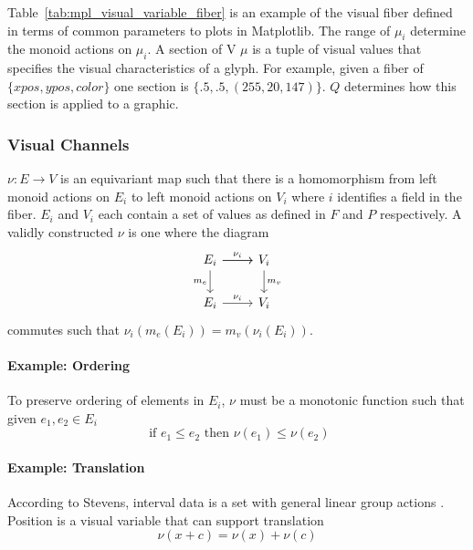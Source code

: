 \documentclass[../main.tex]{subfiles}
\begin{document}
Table~\ref{tab:mpl_visual_variable_fiber} is an example of the visual fiber defined in terms of common parameters to plots in Matplotlib. The range of $\mu_{i}$ determine the monoid actions on $\mu_{i}$. A section of V $\mu$ is a tuple of visual values that specifies the visual characteristics of a glyph. For example, given a fiber of $\{xpos, ypos, color\}$ one section is $\{.5, .5, (255, 20,147)\}$. $Q$ determines how this section is applied to a graphic.  

\subsubsection{Visual Channels}
\label{sec:artist_nu}
$\nu: E \rightarrow V$ is an equivariant map such that there is a homomorphism from left monoid actions on $E_{i}$ to left monoid actions on $V_{i}$ where $i$ identifies a field in the fiber. $E_i$ and $V_{i}$ each contain a set of values as defined in $F$ and $P$ respectively. A validly constructed $\nu$ is one where the  diagram 
\begin{equation}
    \label{eq:nu_categorical}
\begin{tikzcd}
    E_i \arrow[r] \arrow[r, "\nu_i"] \arrow[d, "m_e"'] & V_i \arrow[d, "m_v"] \\
    E_i \arrow[r, "\nu_i"]                           & V_i               
\end{tikzcd}
\end{equation}
commutes such that $\nu_i(m_e(E_i)) = m_v(\nu_i(E_i))$.

\paragraph{Example: Ordering}
To preserve ordering of elements in $E_i$, $\nu$ must be a monotonic function such that given $e_1, e_2 \in E_{i}$
\begin{equation}
\text{ if } e_1 \leq e_2 \text{ then } \nu(e_1) \leq \nu(e_2)
\end{equation}

\paragraph{Example: Translation}
According to Stevens, interval data is a set with general linear group actions \cite{stevensTheoryScalesMeasurement1946,leaFormalizationMeasurementScale}. Position is a visual variable that can support translation 
\begin{equation}
\nu(x + c) = \nu(x) + \nu(c)
\end{equation}
\end{document}
